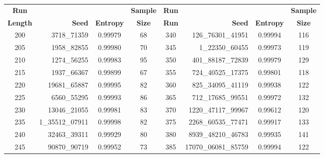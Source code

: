 \documentclass[preprint]{sigplanconf}
\begin{document}
\begin{table}
    \begin{center}
        \begin{tabular}{|c r c c| c r c c|}
            \hline
            \textbf{Run}    &                   &                  & \textbf{Sample} & \textbf{Run} &                        &                  & \textbf{Sample} \\
            \textbf{Length} & \textbf{Seed}     & \textbf{Entropy} & \textbf{Size}   & \textbf{Run} & \textbf{Seed}          & \textbf{Entropy} & \textbf{Size}   \\
            \hline
            200             & 3718\_71359       & 0.99979          & 68              & 340          & 126\_76301\_41951      & 0.99994          & 116             \\
            205             & 1958\_82855       & 0.99980          & 70              & 345          & 1\_22350\_60455        & 0.99973          & 119             \\
            210             & 1274\_56255       & 0.99983          & 95              & 350          & 401\_88187\_72839      & 0.99979          & 129             \\
            215             & 1937\_66367       & 0.99899          & 67              & 355          & 724\_40525\_17375      & 0.99801          & 118             \\
            220             & 19681\_65887      & 0.99995          & 82              & 360          & 825\_34095\_41119      & 0.99938          & 122             \\
            225             & 6560\_55295       & 0.99993          & 86              & 365          & 712\_17685\_99551      & 0.99972          & 132             \\
            230             & 13046\_21055      & 0.99981          & 83              & 370          & 1220\_47117\_99967     & 0.99612          & 120             \\
            235             & 1\_35512\_07911   & 0.99998          & 82              & 375          & 2268\_60535\_77471     & 0.99917          & 133             \\
            240             & 32463\_39311      & 0.99929          & 80              & 380          & 8939\_48210\_46783     & 0.99935          & 141             \\
            245             & 90870\_90719      & 0.99952          & 73              & 385          & 17070\_06081\_85759    & 0.99994          & 122             \\

\end{tabular}
\end{center}
\end{table}
\end{document}
